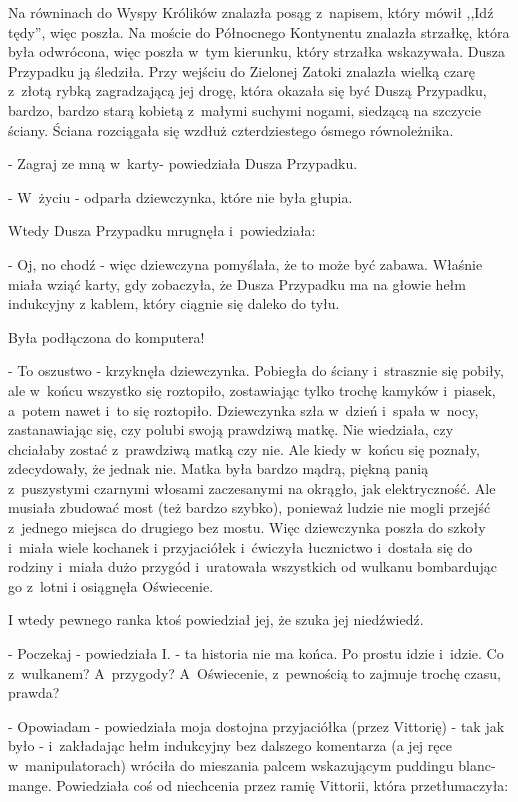 \documentclass[oneside,polish,12pt,sfheadings]{mwbk}
\begin{document}
Na równinach do Wyspy Królików znalazła posąg z~napisem, który mówił
,,Idź tędy'', więc poszła. Na moście do Północnego Kontynentu znalazła
strzałkę, która była odwrócona, więc poszła w~tym kierunku, który
strzałka wskazywała. Dusza Przypadku ją śledziła. Przy wejściu do
Zielonej Zatoki znalazła wielką czarę z~złotą rybką zagradzającą jej
drogę, która okazała się być Duszą Przypadku, bardzo, bardzo starą
kobietą z~małymi suchymi nogami, siedzącą na szczycie ściany. Ściana
rozciągała się wzdłuż czterdziestego ósmego równoleżnika.

- Zagraj ze mną w~karty- powiedziała Dusza Przypadku.

- W~życiu - odparła dziewczynka, które nie była głupia.

Wtedy Dusza Przypadku mrugnęła i~powiedziała: 

- Oj, no chodź - więc dziewczyna pomyślała, że to może być zabawa. Właśnie miała wziąć
karty, gdy zobaczyła, że Dusza Przypadku ma na głowie hełm indukcyjny
z kablem, który ciągnie się daleko do tyłu.

Była podłączona do komputera!

- To oszustwo - krzyknęła dziewczynka. Pobiegła do ściany i~strasznie
się pobiły, ale w~końcu wszystko się roztopiło, zostawiając tylko
trochę kamyków i~piasek, a~potem nawet i~to się roztopiło. Dziewczynka
szła w~dzień i~spała w~nocy, zastanawiając się, czy polubi swoją prawdziwą
matkę. Nie wiedziała, czy chciałaby zostać z~prawdziwą matką czy nie.
Ale kiedy w~końcu się poznały, zdecydowały, że jednak nie. Matka była
bardzo mądrą, piękną panią z~puszystymi czarnymi włosami zaczesanymi
na okrągło, jak elektryczność. Ale musiała zbudować most (też bardzo
szybko), ponieważ ludzie nie mogli przejść z~jednego miejsca do drugiego
bez mostu. Więc dziewczynka poszła do szkoły i~miała wiele kochanek
i przyjaciółek i~ćwiczyła łucznictwo i~dostała się do rodziny i~miała
dużo przygód i~uratowała wszystkich od wulkanu bombardując go z~lotni
i osiągnęła Oświecenie.

I wtedy pewnego ranka ktoś powiedział jej, że szuka jej niedźwiedź.

- Poczekaj - powiedziała I. - ta historia nie ma końca. Po prostu
idzie i~idzie. Co z~wulkanem? A~przygody? A~Oświecenie, z~pewnością
to zajmuje trochę czasu, prawda?

- Opowiadam - powiedziała moja dostojna przyjaciółka (przez Vittorię)
- tak jak było - i~zakładając hełm indukcyjny bez dalszego komentarza
(a jej ręce w~manipulatorach) wróciła do mieszania palcem wskazującym
puddingu blanc-mange. Powiedziała coś od niechcenia przez ramię Vittorii,
która przetłumaczyła: 
\end{document}
